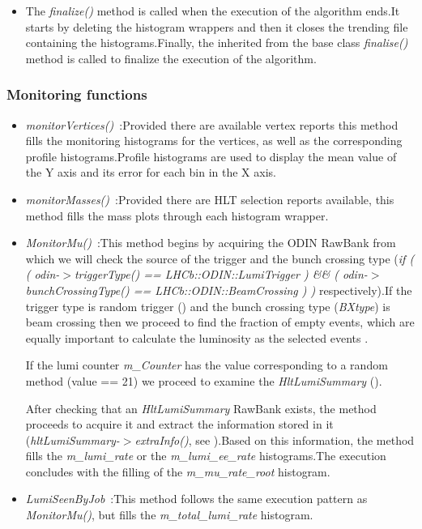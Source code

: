 \begin{itemize}
\item The \textit{finalize()} method is called when the execution of the algorithm ends.It starts by deleting the histogram wrappers and then it closes the trending file containing the histograms.Finally, the inherited from the base class \textit{finalise()} method is called to finalize the execution of the algorithm.\par
 
\end{itemize}

\subsubsection{\textbf{Monitoring functions}}\label{sec:hlt1methods}
\begin{itemize}
\item \textit{monitorVertices()}~:Provided there are available vertex reports this method fills the monitoring histograms for the vertices, as well as the corresponding profile histograms.Profile histograms are used to display the mean value of the Y axis and its error for each bin in the X axis.\par
\item \textit{monitorMasses()}~:Provided there are HLT selection reports available, this method fills the mass plots through each histogram wrapper.\par
\item \textit{MonitorMu()}~:This method begins by acquiring the ODIN RawBank from which we will check the source of the trigger and the bunch crossing type (\textit{if ( ( odin-$>$triggerType() == LHCb::ODIN::LumiTrigger ) && ( odin-$>$bunchCrossingType() == LHCb::ODIN::BeamCrossing ) )} respectively).If the trigger type is random trigger (\cite{odin_bank})  and the bunch crossing type (\textit{BXtype}) is beam crossing then we proceed to find the fraction of empty events, which are equally important to calculate the luminosity as the selected events \cite{lumiCnt}.\par
If the lumi counter \textit{m\_Counter} has the value corresponding to a random method (value == 21) we proceed to examine the \textit{HltLumiSummary} (\cite{lumiXML}).\par
After checking that an \textit{HltLumiSummary} RawBank exists, the method proceeds to acquire it and extract the information stored in it (\textit{hltLumiSummary-$>$extraInfo()}, see \cite{lumiSum}).Based on this information, the method fills the \textit{m\_lumi\_rate} or the  \textit{m\_lumi\_ee\_rate} histograms.The execution concludes with the filling of the \textit{m\_mu\_rate\_root} histogram.\par
\item \textit{LumiSeenByJob}~:This method follows the same execution pattern as \textit{MonitorMu()}, but fills the \textit{m\_total\_lumi\_rate} histogram.\par


\end{itemize}


